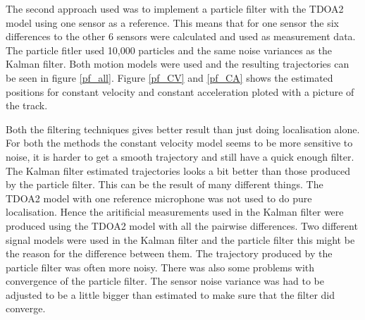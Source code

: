 \documentclass[10pt,a4paper]{report}
\begin{document}
The second approach used was to implement a particle filter with the TDOA2 model using one sensor as a reference.
This means that for one sensor the six differences to the other 6 sensors were calculated and used as measurement data.
The particle fitler used 10,000 particles and the same noise variances as the Kalman filter.
Both motion models were used and the resulting trajectories can be seen in figure \ref{pf_all}.
Figure \ref{pf_CV} and \ref{pf_CA} shows the estimated positions for constant velocity and constant acceleration ploted with a picture of the track.

Both the filtering techniques gives better result than just doing localisation alone.
For both the methods the constant velocity model seems to be more sensitive to noise, it is harder to get a smooth trajectory and still have a quick enough filter.
The Kalman filter estimated trajectories looks a bit better than those produced by the particle filter.
This can be the result of many different things. The TDOA2 model with one reference microphone was not used to do pure localisation.
Hence the aritificial measurements used in the Kalman filter were produced using the TDOA2 model with all the pairwise differences.
Two different signal models were used in the Kalman filter and the particle filter this might be the reason for the difference between them.
The trajectory produced by the particle filter was often more noisy.
There was also some problems with convergence of the particle filter.
The sensor noise variance was had to be adjusted to be a little bigger than estimated to make sure that the filter did converge.
\end{document}
